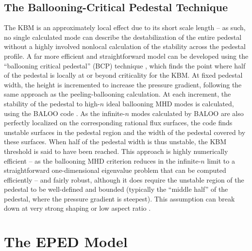 \noindent{}

\subsection{The Ballooning-Critical Pedestal Technique}\label{subsec:mod_bcp}

The KBM is an approximately local effect due to its short scale length -- as such, no single calculated mode can describe the destabilization of the entire pedestal without a highly involved nonlocal calculation of the stability across the pedestal profile.  A far more efficient and straightforward model can be developed using the ``ballooning critical pedestal'' (BCP) technique \cite{Snyder2010,Snyder2011}, which finds the point where half of the pedestal is locally at or beyond criticality for the KBM.  At fixed pedestal width, the height is incremented to increase the pressure gradient, following the same approach as the peeling-ballooning calculation.  At each increment, the stability of the pedestal to high-$n$ ideal ballooning MHD modes is calculated, \eg using the BALOO code \cite{Connor1979,Miller1987}.  As the infinite-$n$ modes calculated by BALOO are also perfectly localized on the corresponding rational flux surfaces, the code finds unstable surfaces in the pedestal region and the 
width of the pedestal covered by these surfaces.  When half of the pedestal width is thus unstable, the KBM threshold is said to have been reached.  This approach is highly numerically efficient -- as the ballooning MHD criterion reduces in the infinite-$n$ limit to a straightforward one-dimensional eigenvalue problem \cite{Connor1979} that can be computed efficiently -- and fairly robust, although it does require the unstable region of the pedestal to be well-defined and bounded (typically the ``middle half'' of the pedestal, where the pressure gradient is steepest).  This assumption can break down at very strong shaping or low aspect ratio \cite{Snyder2011}.\nicesectionending

\section{The EPED Model}\label{sec:mod_eped}

